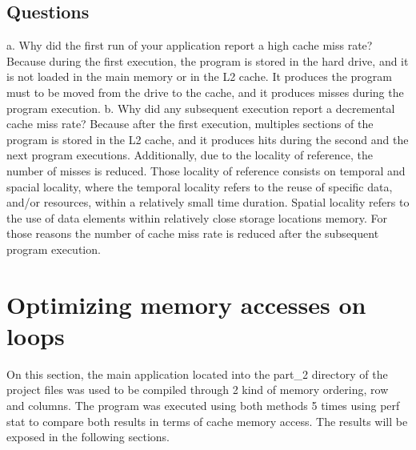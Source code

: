 \documentclass[xcolor=table]{llncs}
\begin{document}
\subsection{Questions}
%
a. Why did the first run of your application report a high cache miss rate?\newline
Because during the first execution, the program is stored in the hard drive, and it is not loaded in the main memory or in the L2 cache.
It produces the program must to be moved from the drive to the cache, and it produces misses during the program execution.\newline\newline
b. Why did any subsequent execution report a decremental cache miss rate?\newline
Because after the first execution, multiples sections of the program is stored in the L2 cache, and it produces hits during the second and the next program executions. Additionally, due to the locality of reference, the number of misses is reduced.\newline
Those locality of reference consists on temporal and spacial locality, where the temporal locality refers to the reuse of specific data, and/or resources, within a relatively small time duration. Spatial locality refers to the use of data elements within relatively close storage locations memory.\newline
For those reasons the number of cache miss rate is reduced after the subsequent program execution.
\newline
%
\section{Optimizing memory accesses on loops}
%
On this section, the main application located into the part\_2 directory of the project files was used to be compiled through 2 kind of memory ordering, row and columns. 
The program was executed using both methods 5 times using perf stat to compare both results in terms of cache memory access. The results will be exposed in the following sections.\newline
\end{document}
